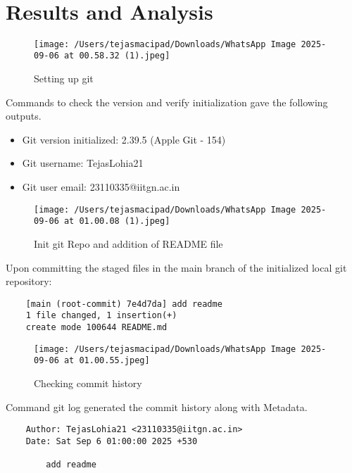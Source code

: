 \documentclass[12pt, a4paper]{report}
\begin{document}
\
\section{Results and Analysis}

\begin{figure}[!h]
    \centering
    \texttt{[image: /Users/tejasmacipad/Downloads/WhatsApp Image 2025-09-06 at 00.58.32 (1).jpeg]}
    \caption{Setting up git}
    \label{fig:lab1}
\end{figure}

Commands to check the version and verify initialization gave the following outputs.

\begin{itemize}
    \item {Git version initialized:} 2.39.5 (Apple Git - 154)
    \item {Git username:} TejasLohia21
    \item {Git user email:} 23110335@iitgn.ac.in
\end{itemize}



\begin{figure}[!h]
    \centering
    \texttt{[image: /Users/tejasmacipad/Downloads/WhatsApp Image 2025-09-06 at 01.00.08 (1).jpeg]}
    \caption{Init git Repo and addition of README file}
    \label{fig:lab2}
\end{figure}

Upon committing the staged files in the main branch of the initialized local git repository:
\begin{verbatim}
    [main (root-commit) 7e4d7da] add readme
    1 file changed, 1 insertion(+)
    create mode 100644 README.md
\end{verbatim}

\newpage

\begin{figure}[!h]
    \centering
    \texttt{[image: /Users/tejasmacipad/Downloads/WhatsApp Image 2025-09-06 at 01.00.55.jpeg]}
    \caption{Checking commit history}
    \label{fig:lab3}
\end{figure}

Command git log generated the commit history along with Metadata.

\begin{verbatim}
    Author: TejasLohia21 <23110335@iitgn.ac.in>
    Date: Sat Sep 6 01:00:00 2025 +530

        add readme
\end{verbatim}
\end{document}
